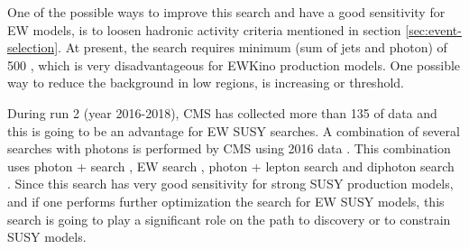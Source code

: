 One of the possible ways to improve this search and have a good sensitivity for EW models, is to loosen hadronic activity criteria 
mentioned in section \ref{sec:event-selection}. At present, the search requires minimum \ST (sum \pt of jets and photon) of 500 \gev,
which is very disadvantageous for EWKino production models. One possible way to reduce the background in low \ST regions, is increasing
\ptg or \ptmiss threshold.

During run 2 (year 2016-2018), CMS has collected more than 135 \fbinv of data and this is going to be an advantage for EW SUSY
searches. A combination of several searches with photons is performed by CMS using 2016 data \cite{CMS-PAS-SUS-18-005}.
This combination uses photon + \ST search \cite{Sirunyan:2017yse}, EW search \cite{Sirunyan:2017nyt}, photon + lepton search
\cite{Sirunyan:2018psa} and diphoton search \cite{Sirunyan:2019mbp}. Since this search has very good sensitivity 
for strong SUSY production models, and if one performs further optimization the search for EW SUSY models, this search is going to play
a significant role on the path to discovery or to constrain SUSY models. \nocite{Sirunyan:2019hzr2,CMS-PAS-SUS-18-002,AnalysisNote,DetectorNote}